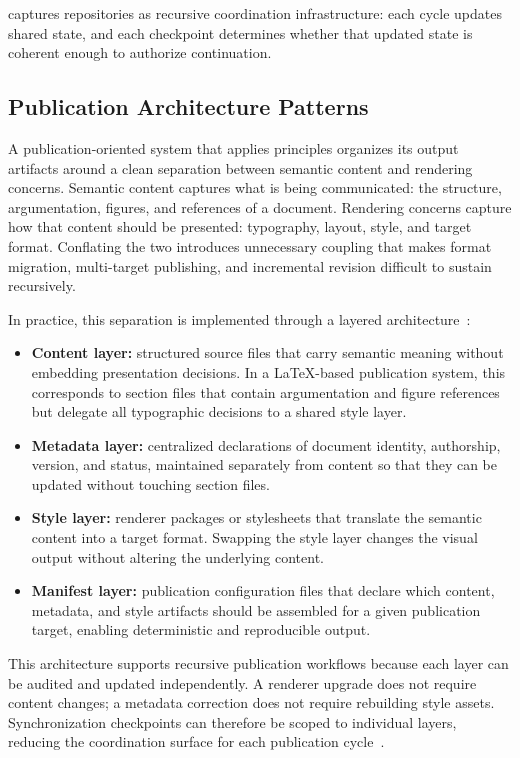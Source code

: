  captures repositories as recursive coordination infrastructure: each cycle updates shared state, and each checkpoint determines whether that updated state is coherent enough to authorize continuation.

\subsection{Publication Architecture Patterns}

A publication-oriented system that applies  principles organizes its output artifacts around a clean separation between semantic content and rendering concerns. Semantic content captures what is being communicated: the structure, argumentation, figures, and references of a document. Rendering concerns capture how that content should be presented: typography, layout, style, and target format. Conflating the two introduces unnecessary coupling that makes format migration, multi-target publishing, and incremental revision difficult to sustain recursively.

In practice, this separation is implemented through a layered architecture~\cite{Parnas1972Modularization}:
\begin{itemize}
  \item \textbf{Content layer:} structured source files that carry semantic meaning without embedding presentation decisions. In a \LaTeX-based publication system, this corresponds to section files that contain argumentation and figure references but delegate all typographic decisions to a shared style layer.
  \item \textbf{Metadata layer:} centralized declarations of document identity, authorship, version, and status, maintained separately from content so that they can be updated without touching section files.
  \item \textbf{Style layer:} renderer packages or stylesheets that translate the semantic content into a target format. Swapping the style layer changes the visual output without altering the underlying content.
  \item \textbf{Manifest layer:} publication configuration files that declare which content, metadata, and style artifacts should be assembled for a given publication target, enabling deterministic and reproducible output.
\end{itemize}

This architecture supports recursive publication workflows because each layer can be audited and updated independently. A renderer upgrade does not require content changes; a metadata correction does not require rebuilding style assets. Synchronization checkpoints can therefore be scoped to individual layers, reducing the coordination surface for each publication cycle~\cite{Vogels2009EventuallyConsistent}.

